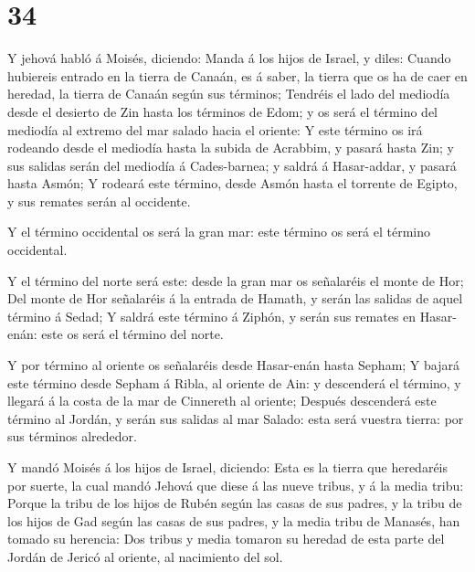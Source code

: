 \hypertarget{section-33}{%
\section{34}\label{section-33}}

 Y jehová habló á Moisés, diciendo:  Manda á los
hijos de Israel, y diles: Cuando hubiereis entrado en la tierra de
Canaán, es á saber, la tierra que os ha de caer en heredad, la tierra de
Canaán según sus términos;  Tendréis el lado del mediodía
desde el desierto de Zin hasta los términos de Edom; y os será el
término del mediodía al extremo del mar salado hacia el oriente:
 Y este término os irá rodeando desde el mediodía hasta la
subida de Acrabbim, y pasará hasta Zin; y sus salidas serán del mediodía
á Cades-barnea; y saldrá á Hasar-addar, y pasará hasta Asmón;
 Y rodeará este término, desde Asmón hasta el torrente de
Egipto, y sus remates serán al occidente.

 Y el término occidental os será la gran mar: este término
os será el término occidental.

 Y el término del norte será este: desde la gran mar os
señalaréis el monte de Hor;  Del monte de Hor señalaréis á
la entrada de Hamath, y serán las salidas de aquel término á Sedad;
 Y saldrá este término á Ziphón, y serán sus remates en
Hasar-enán: este os será el término del norte.

 Y por término al oriente os señalaréis desde Hasar-enán
hasta Sepham;  Y bajará este término desde Sepham á Ribla,
al oriente de Ain: y descenderá el término, y llegará á la costa de la
mar de Cinnereth al oriente;  Después descenderá este
término al Jordán, y serán sus salidas al mar Salado: esta será vuestra
tierra: por sus términos alrededor.

 Y mandó Moisés á los hijos de Israel, diciendo: Esta es la
tierra que heredaréis por suerte, la cual mandó Jehová que diese á las
nueve tribus, y á la media tribu:  Porque la tribu de los
hijos de Rubén según las casas de sus padres, y la tribu de los hijos de
Gad según las casas de sus padres, y la media tribu de Manasés, han
tomado su herencia:  Dos tribus y media tomaron su heredad
de esta parte del Jordán de Jericó al oriente, al nacimiento del sol.

